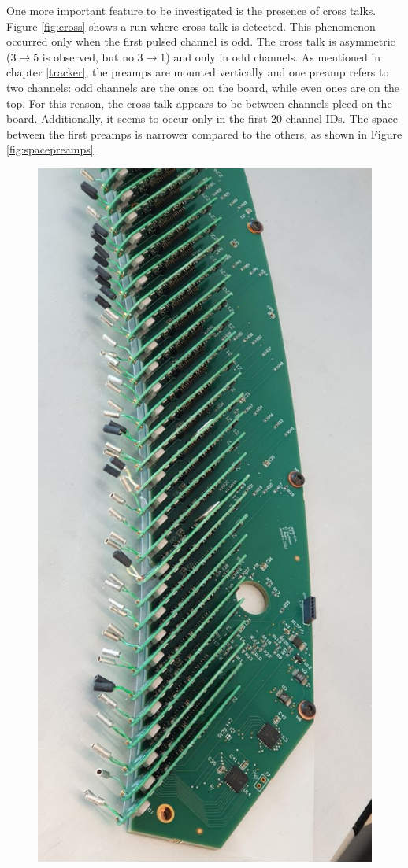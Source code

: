 One more important feature to be investigated is the presence of cross talks. Figure \ref{fig:cross} shows a run where cross talk is detected.
This phenomenon occurred only when the first pulsed channel is odd. The cross talk is asymmetric (3$\rightarrow$5 is observed, 
but no 3$\rightarrow$1) and only in odd channels.
As mentioned in chapter \ref{tracker}, the preamps are mounted vertically and one preamp refers to two channels: odd channels are the ones on the board, 
while even ones are on the top. For this reason, the cross talk appears to be between channels plced on the board. 
Additionally, it seems to occur only in the first 20 channel IDs.
The space between the first preamps is narrower compared to the others, as shown in Figure \ref{fig:spacepreamps}. 
\begin{figure}[!h]
  \centering
  \includegraphics[angle=90,width=\textwidth]{figures/jpg/photo_6028424923279639562_y.jpg}

\end{figure}
